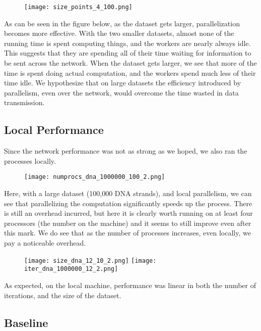 \documentclass[12pt]{article}
\begin{document}
\begin{figure}[H]
\centering
\texttt{[image: size\_points\_4\_100.png]}
\end{figure}

As can be seen in the figure below, as the dataset gets larger, parallelization becomes more effective. With the two smaller datasets, almost none of the running time is spent computing things, and the workers are nearly always idle. This suggests that they are spending all of their time waiting for information to be sent across the network. When the dataset gets larger, we see that more of the time is spent doing actual computation, and the workers spend much less of their time idle. We hypothesize that on large datasets the efficiency introduced by parallelism, even over the network, would overcome the time wasted in data transmission.


\subsection{Local Performance}

Since the network performance was not as strong as we hoped, we also ran the processes locally.

\begin{figure}[H]
\centering
\texttt{[image: numprocs\_dna\_1000000\_100\_2.png]}
\end{figure}

Here, with a large dataset (100,000 DNA strands), and local parallelism, we can see that parallelizing the computation significantly speeds up the process. There is still an overhead incurred, but here it is clearly worth running on at least four processors (the number on the machine) and it seems to still improve even after this mark. We do see that as the number of processes increases, even locally, we pay a noticeable overhead.


\begin{figure}[H]
\centering
\texttt{[image: size\_dna\_12\_10\_2.png]}
\texttt{[image: iter\_dna\_1000000\_12\_2.png]}
\end{figure}

As expected, on the local machine, performance was linear in both the number of iterations, and the size of the dataset.

\subsection{Baseline}
\end{document}
